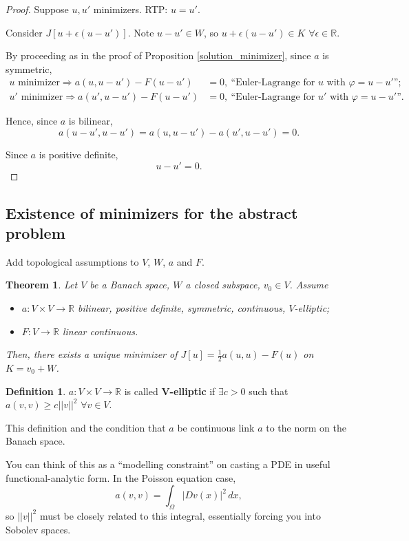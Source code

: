 \documentclass[12pt]{article}
\newtheorem{theorem}{Theorem}[section]
\theoremstyle{definition}
\newtheorem*{definition*}{Definition}
\begin{document}
\begin{proof}
Suppose $u,u'$ minimizers. RTP: $u=u'$.

Consider $J[u+\epsilon(u-u')]$. Note $u-u'\in W$, so $u+\epsilon(u-u')\in K$ $\forall\epsilon\in\mathbb{R}$.

By proceeding as in the proof of Proposition \ref{solution_minimizer}, since $a$ is symmetric,
\begin{align*}
u\text{ minimizer}\Longrightarrow a(u,u-u')-F(u-u')&=0,\ \text{``Euler-Lagrange for }u\text{ with }\varphi=u-u'\text{''};\\
u'\text{ minimizer}\Longrightarrow a(u',u-u')-F(u-u')&=0,\ \text{``Euler-Lagrange for }u'\text{ with }\varphi=u-u'\text{''}.
\end{align*}

Hence, since $a$ is bilinear,
\[a(u-u',u-u')=a(u,u-u')-a(u',u-u')=0.\]

Since $a$ is positive definite,
\[u-u'=0.\]
\end{proof}

\subsection{Existence of minimizers for the abstract problem}
Add topological assumptions to $V$, $W$, $a$ and $F$.

\begin{theorem}\label{existence_minimizer}
Let $V$ be a Banach space, $W$ a closed subspace, $v_0\in V$. Assume
\begin{itemize}
\item $a:V\times V\rightarrow\mathbb{R}$ bilinear, positive definite, symmetric, continuous, $V$-elliptic;
\item $F:V\rightarrow\mathbb{R}$ linear continuous.
\end{itemize}
Then, there exists a unique minimizer of $J[u]=\frac{1}{2}a(u,u)-F(u)$ on $K=v_0+W$.
\end{theorem}

\begin{definition*}
$a:V\times V\rightarrow\mathbb{R}$ is called \textbf{$\boldsymbol{V}$-elliptic} if $\exists c>0$ such that $a(v,v)\geq c||v||^2$ $\forall v\in V$.
\end{definition*}

This definition and the condition that $a$ be continuous link $a$ to the norm on the Banach space.

You can think of this as a ``modelling constraint'' on casting a PDE in useful functional-analytic form. In the Poisson equation case,
\[a(v,v)=\int_{\Omega}|Dv(x)|^2\,dx,\]
so $||v||^2$ must be closely related to this integral, essentially forcing you into Sobolev spaces.
\end{document}
